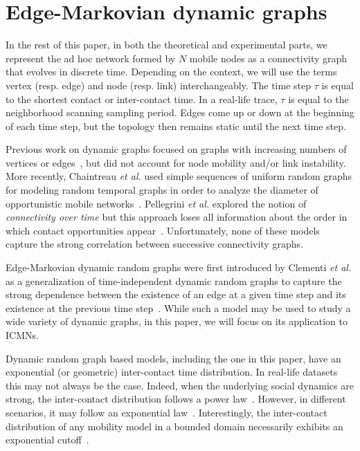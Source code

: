 \documentclass[final,journal,letterpaper]{IEEEtran}
\begin{document}
\section{Edge-Markovian dynamic graphs}
\label{sec:markovian_graphs}

\IEEEpubidadjcol

In the rest of this paper, in both the theoretical and experimental parts, we represent the ad hoc network formed by $N$ mobile nodes as a connectivity graph that evolves in discrete time. Depending on the context, we will use the terms vertex (resp. edge) and node (resp. link) interchangeably. The time step $\tau$ is equal to the shortest contact or inter-contact time. In a real-life trace, $\tau$ is equal to the neighborhood scanning sampling period. Edges come up or down at the beginning of each time step, but the topology then remains static until the next time step.

Previous work on dynamic graphs focused on graphs with increasing numbers of vertices or edges~\cite{GOT}, but did not account for node mobility and/or link instability. More recently, Chaintreau \emph{et al.} used simple sequences of uniform random graphs for modeling random temporal graphs in order to analyze the diameter of opportunistic mobile networks~\cite{chaintreau_diam}. Pellegrini \emph{et al.} explored the notion of \emph{connectivity over time} but this approach loses all information about the order in which contact opportunities appear~\cite{pellegrini07}. Unfortunately, none of these models capture the strong correlation between successive connectivity graphs.

Edge-Markovian dynamic random graphs were first introduced by Clementi \textit{et al.} as a generalization of time-independent dynamic random graphs to capture the strong dependence between the existence of an edge at a given time step and its existence at the previous time step~\cite{Clementi08}. While such a model may be used to  study a wide variety of dynamic graphs, in this paper, we will focus on its application to ICMNs.

Dynamic random graph based models, including the one in this paper, have an exponential (or geometric) inter-contact time distribution. In real-life datasets this may not always be the case. Indeed, when the underlying social dynamics are strong, the inter-contact distribution follows a power law~\cite{chaintreau_mobility}. However, in different scenarios, it may follow an exponential law~\cite{lenders08}. Interestingly, the inter-contact distribution of any mobility model in a bounded domain necessarily exhibits an exponential cutoff~\cite{cai07}.
\end{document}
